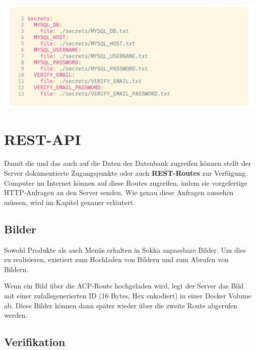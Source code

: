 \begin{code}[htp]
    \begin{center}
        \includegraphics[width=1\textwidth]{images/Backend/secrets.png}
        \vspace{-25pt}
        \caption{Sokkas Docker Secrets in der \lstinline{docker-compose.yml}}
    \end{center}
\end{code}

\section{REST-API}

Damit die \textit{} und das \textit{} auch auf die Daten der Datenbank zugreifen können stellt der Server dokumentierte Zugangspunkte oder auch \textbf{REST-Routes} zur Verfügung. Computer im Internet können auf diese Routes zugreifen, indem sie vorgefertige HTTP-Anfragen an den Server senden. Wie genau diese Anfragen aussehen müssen, wird im Kapitel \textit{} genauer erläutert.

\subsection{Bilder}

Sowohl Produkte als auch Menüs erhalten in Sokka anpassbare Bilder. Um dies zu realisieren, existiert \textit{} zum Hochladen von Bildern und \textit{} zum Abrufen von Bildern.

Wenn ein Bild über die ACP-Route hochgeladen wird, legt der Server das Bild mit einer zufallsgenerierten ID (16 Bytes, Hex enkodiert) in einer Docker Volume ab. Diese Bilder können dann später wieder über die zweite Route abgerufen werden.

\subsection{Verifikation}
\label{verification}

